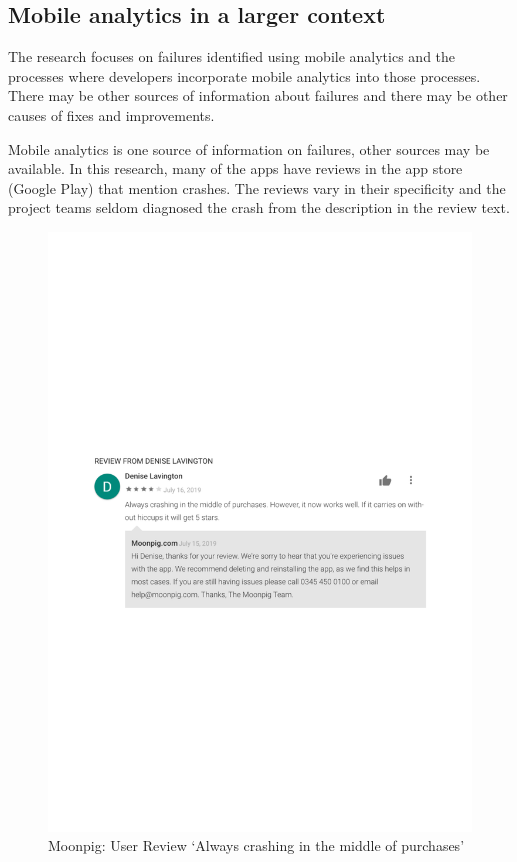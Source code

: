 \subsection{Mobile analytics in a larger context}
The research focuses on failures identified using mobile analytics and the processes where developers incorporate mobile analytics into those processes. There may be other sources of information about failures and there may be other causes of fixes and improvements.

Mobile analytics is one source of information on failures, other sources may be available. In this research, many of the apps have reviews in the app store (Google Play) that mention crashes. The reviews vary in their specificity and the project teams seldom diagnosed the crash from the description in the review text.   

\begin{figure}
    \centering
    \includegraphics[width=\linewidth]{images/google-play/Denise-Lavington-Review-moonpig-crashing-2019.pdf}
    \caption[Moonpig: User Review in Google Play `Always crashes...']{Moonpig: User Review `Always crashing in the middle of purchases'}
    \label{fig:gp-review-denise-lavington-always-crashes}
\end{figure}

